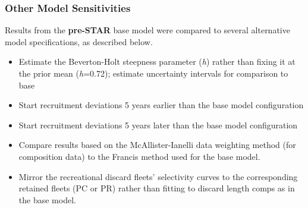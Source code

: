 \documentclass[11pt,
  english,
]{article}
\begin{document}

\hypertarget{other-model-sensitivities}{%
\subsubsection{Other Model Sensitivities}\label{other-model-sensitivities}}

\leavevmode\tagmcend\tagstructend

Results from the \textbf{pre-STAR} base model were compared to several alternative model specifications, as described below.


\begin{itemize}
\item

  Estimate the Beverton-Holt steepness parameter (\emph{h}) rather than fixing it at the prior mean (\emph{h}=0.72); estimate uncertainty intervals for comparison to base

  \tagmcend\tagstructend\tagstructend
\item

  Start recruitment deviations 5 years earlier than the base model configuration

  \tagmcend\tagstructend\tagstructend
\item

  Start recruitment deviations 5 years later than the base model configuration

  \tagmcend\tagstructend\tagstructend
\item

  Compare results based on the McAllister-Ianelli data weighting method (for composition data) to the Francis method used for the base model.

  \tagmcend\tagstructend\tagstructend
\item

  Mirror the recreational discard fleets' selectivity curves to the corresponding retained fleets (PC or PR) rather than fitting to discard length comps as in the base model.

  \tagmcend\tagstructend\tagstructend
\end{itemize}
\end{document}
